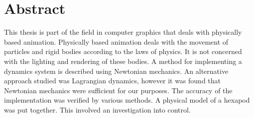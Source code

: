 \chapter{Abstract}
This thesis is part of the field in computer graphics that deals with
physically based animation. Physically based animation deals with the movement
of particles and rigid bodies according to the laws of physics. It is not
concerned with the lighting and rendering of these bodies. A method for implementing
a dynamics system is described using Newtonian mechanics. An alternative approach
studied was Lagrangian dynamics, however it was found that Newtonian mechanics
were sufficient for our purposes. The accuracy of the implementation was verified by
various methods. A physical model of a hexapod was put together. This
involved an investigation into control.

